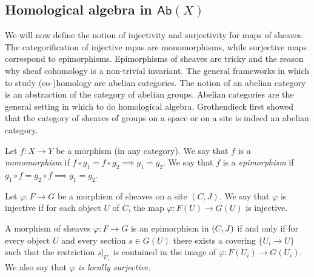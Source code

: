 \subsection{Homological algebra in \texorpdfstring{$\mathsf{Ab}(X)$}{Ab(X)}}
We will now define the notion of injectivity and surjectivity for maps of sheaves. The categorification of injective mpas are monomorphisms, while surjective maps correspond to epimorphisms. Epimorphisms of sheaves are tricky and the reason why sheaf cohomology is a non-trivial invariant. The general frameworks in which to study (co-)homology are abelian categories. The notion of an abelian category is an abstraction of the category of abelian groups. Abelian categories are the general setting in which to do homological algebra. Grothendieck first showed that the category of sheaves of groups on a space or on a site is indeed an abelian category.

\begin{definition}
	Let $f: X \to Y$ be a morphism (in any category). We say that $f$ is a \textit{monomorphism} if $f \circ g_1 = f \circ g_2 \implies g_1 = g_2$.
	We say that $f$ is a \textit{epimorphism} if $g_1 \circ  f  = g_2 \circ f \implies g_1 = g_2$.
\end{definition}

\begin{proposition}[Monomorphisms in $\sh(C,J)$]
	Let $\varphi: F \to G$ be a morphism of sheaves on a site $(C,J)$. We say that $\varphi$ is injective if for each object $U$ of $C$, the map $\varphi: F(U) \to G(U)$ is injective.
\end{proposition}

\begin{proposition}[Epimorphisms in $\sh(C,J)$]
	A morphism of sheaves $\varphi: F \to G$ is an epimorphism in $\mathcal{(}C,J)$ if and only if for every object $U$ and every section $s \in G(U)$ there exists a covering $\{U_i \to U\}$ such that the restriction $s|_{U_i}$ is contained in the image of $\varphi: F(U_i) \to G(U_i)$. We also say that \textit{$\varphi$ is locally surjective}.
\end{proposition}

